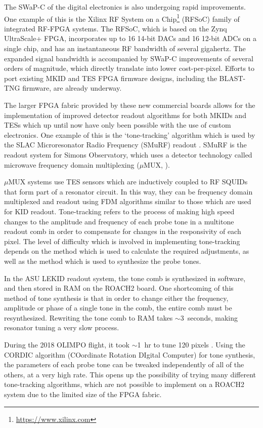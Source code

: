 The SWaP-C of the digital electronics is also undergoing rapid improvements. One example of this is the Xilinx RF System on a Chip\footnote{\url{https://www.xilinx.com}} (RFSoC) family of integrated RF-FPGA systems. The RFSoC, which is based on the Zynq UltraScale+ FPGA, incorporates up to 16 14-bit DACs and 16 12-bit ADCs on a single chip, and has an instantaneous RF bandwidth of several gigahertz. The expanded signal bandwidth is accompanied by SWaP-C improvements of several orders of magnitude, which directly translate into lower cost-per-pixel. Efforts to port existing MKID and TES FPGA firmware designs, including the BLAST-TNG firmware, are already underway.

The larger FPGA fabric provided by these new commercial boards allows for the implementation of improved detector readout algorithms for both MKIDs and TESs which up until now have only been possible with the use of custom electronics. One example of this is the `tone-tracking' algorithm which is used by the SLAC Microresonator Radio Frequency (SMuRF) readout \citep{henderson2018highly}. SMuRF is the readout system for Simons Observatory, which uses a detector technology called microwave frequency domain multiplexing ($\mu$MUX, \citet{irwin2004microwave}).

$\mu$MUX systems use TES sensors which are inductively coupled to RF SQUIDs that form part of a resonator circuit. In this way, they can be frequency domain multiplexed and readout using FDM algorithms similar to those which are used for KID readout. Tone-tracking refers to the process of making high speed changes to the amplitude and frequency of each probe tone in a multitone readout comb in order to compensate for changes in the responsivity of each pixel. The level of difficulty which is involved in implementing tone-tracking depends on the method which is used to calculate the required adjustments, as well as the method which is used to synthesize the probe tones.

In the ASU LEKID readout system, the tone comb is synthesized in software, and then stored in RAM on the ROACH2 board. One shortcoming of this method of tone synthesis is that in order to change either the frequency, amplitude or phase of a single tone in the comb, the entire comb must be resynthesized. Rewriting the tone comb to RAM takes $\sim$3~seconds, making resonator tuning a very slow process.

During the 2018 OLIMPO flight, it took $\sim$1~hr to tune 120 pixels \citep{masi2019kinetic}. Using the CORDIC algorithm (COordinate Rotation DIgital Computer) for tone synthesis, the parameters of each probe tone can be tweaked independently of all of the others, at a very high rate. This opens up the possibility of trying many different tone-tracking algorithms, which are not possible to implement on a ROACH2 system due to the limited size of the FPGA fabric.


